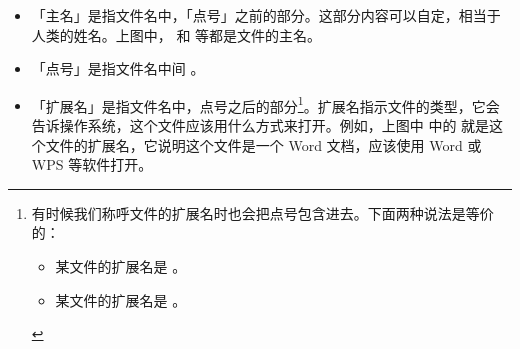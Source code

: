 \begin{itemize}
  \item 「主名」是指文件名中，「点号」之前的部分。这部分内容可以自定，相当于人类的姓名。上图中， 和  等都是文件的主名。
  \item 「点号」是指文件名中间 。
\end{itemize}

\begin{itemize}
  \item 「扩展名」是指文件名中，点号之后的部分\cprotect\footnote{有时候我们称呼文件的扩展名时也会把点号包含进去。下面两种说法是等价的：
    \begin{itemize}
      \item 某文件的扩展名是 。
      \item 某文件的扩展名是 。
    \end{itemize}
  }。扩展名指示文件的类型，它会告诉操作系统，这个文件应该用什么方式来打开。例如，上图中  中的  就是这个文件的扩展名，它说明这个文件是一个 Word 文档，应该使用 Word 或 WPS 等软件打开。
\end{itemize}

